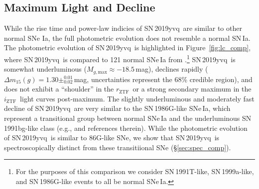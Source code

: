 \documentclass[twocolumn]{aastex63}
\newcommand{\rztf}{$r_\mathrm{ZTF}$}
\newcommand{\iztf}{$i_\mathrm{ZTF}$}
\newcommand{\sn}{SN\,2019yvq}
\begin{document}
\subsection{Maximum Light and Decline}\label{sec:max_decline}

While the rise time and power-law indicies of \sn\ are similar to other normal
SNe Ia, the full photometric evolution does not resemble a normal SN\,Ia. The
photometric evolution of \sn\ is highlighted in Figure~\ref{fig:lc_comp},
where \sn\ is compared to 121 normal SNe\,Ia from \citet{Yao19}.\footnote{For
the purposes of this comparison we consider SN\,1991T-like, SN\,1999a-like,
and SN\,1986G-like events to all be normal SNe\,Ia.} \sn\ is somewhat
underluminous ($M_{g,\mathrm{max}} \approx -18.5$\,mag), declines rapidly
($\Delta m_{15}(g) = 1.30\pm^{0.01}_{0.02}$\,mag, uncertainties represent the
68\% credible region), and does not exhibit a ``shoulder'' in the \rztf\ or a
strong secondary maximum in the \iztf\ light curves post-maximum. The slightly
underluminous and moderately fast decline of \sn\ are very similar to the
SN\,1986G-like SNe\,Ia, which represent a transitional group between normal
SNe\,Ia and the underluminous SN\,1991bg-like class (e.g.,
\citealt{Taubenberger17} and references therein). While the photometric
evolution of \sn\ is similar to 86G-like SNe, we show that \sn\ is
spectroscopically distinct from these transitiional SNe
(\S\ref{sec:spec_comp}).
\end{document}
